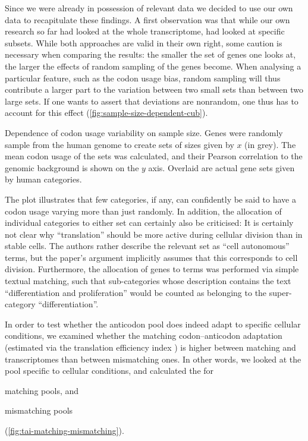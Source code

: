 Since we were already in possession of relevant \trna data we decided to use our
own data to recapitulate these findings. A first observation was that while our
own research so far had looked at the whole transcriptome, \citet{Gingold:2014}
had looked at specific subsets. While both approaches are valid in their own
right, some caution is necessary when comparing the results: the smaller the set
of genes one looks at, the larger the effects of random sampling of the genes
become. When analysing a particular feature, such as the codon usage bias,
random sampling will thus contribute a larger part to the variation between two
small sets than between two large sets. If one wants to assert that deviations
are nonrandom, one thus has to account for this effect
(\cref{fig:sample-size-dependent-cub}).

    {Dependence of codon usage variability on sample size.}
    {Genes were randomly sample from the human genome to create sets of sizes
    given by \(x\) (in grey). The mean codon usage of the sets was calculated,
    and their Pearson correlation to the genomic background is shown on the
    \(y\) axis. Overlaid are actual gene sets given by human \go categories.}

The plot illustrates that few \go categories, if any, can confidently be said to
have a codon usage varying more than just randomly. In addition, the allocation
of individual \go categories to either set can certainly also be criticised: It
is certainly not clear why “translation” should be more active during cellular
division than in stable cells. The authors rather describe the relevant set as
“cell autonomous” \go terms, but the paper’s argument implicitly assumes that
this corresponds to cell division. Furthermore, the allocation of genes to \go
terms was performed via simple textual matching, such that \go sub-categories
whose description contains the text “differentiation and proliferation” would be
counted as belonging to the \go super-category “differentiation”.

In order to test whether the anticodon pool does indeed adapt to specific
cellular conditions, we examined whether the matching codon--anticodon
adaptation (estimated via the translation efficiency index \tai) is higher
between matching \mrna and \trna transcriptomes than between mismatching ones.
In other words, we looked at the \mrna pool specific to cellular conditions, and
calculated the \tai[s] for
\begin{enumerate*}
    \item matching \trna pools, and
    \item mismatching \trna pools
\end{enumerate*}
(\cref{fig:tai-matching-mismatching}).

